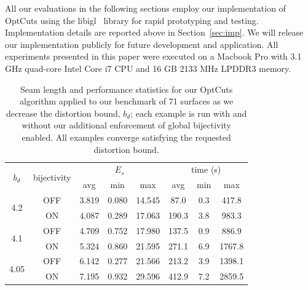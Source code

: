 All our evaluations in the following sections employ our implementation of OptCuts using the libigl~\cite{libigl} library for rapid prototyping and testing. Implementation details are reported above in Section~\ref{sec:imp}. We will release our implementation publicly for future development and application. All experiments presented in this paper were executed on a Macbook Pro with 3.1 GHz quad-core Intel Core i7 CPU and 16 GB 2133 MHz LPDDR3 memory.


\begin{table}[t]
\small
\centering
\caption{Seam length and performance statistics for our OptCuts algorithm applied to our benchmark of 71 surfaces as we decrease the distortion bound, $b_d$; each example is run with and without our additional enforcement of global bijectivity enabled. All examples converge satisfying the requested distortion bound.}
\vspace{-0.3cm}
\label{tb:stats_OptCuts}
\begin{tabular}{|c|c|ccc|ccc|}
\hline
\multirow{2}{*}{$b_d$} & \multirow{2}{*}{bijectivity} & \multicolumn{3}{c|}{$E_{s}$} & \multicolumn{3}{c|}{time (s)} \\ \cline{3-8} 
                       &                         & avg      & min     & max      & avg       & min    & max      \\ \hline
\multirow{2}{*}{4.2}   & OFF                    & 3.819   & 0.080  & 14.545  & 87.0   & 0.3 & 417.8 \\
                       & ON                & 4.087   & 0.289  & 17.063  & 190.3   & 3.8 & 983.3  \\ \hline
\multirow{2}{*}{4.1}   & OFF                    & 4.709   & 0.752  & 17.980  & 137.5  & 0.9 & 886.9 \\
                       & ON                & 5.324   & 0.860  & 21.595  & 271.1   & 6.9 & 1767.8  \\ \hline
\multirow{2}{*}{4.05}  & OFF                    & 6.142   & 0.277  & 21.566  & 213.2  & 3.9 & 1398.1   \\
                       & ON                & 7.195   & 0.932  & 29.596  & 412.9   & 7.2 & 2859.5 \\ \hline
\end{tabular}
\vspace{-0.3cm}
\end{table}


